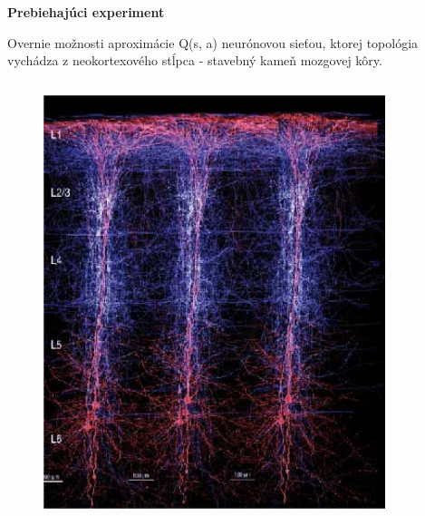 \documentclass[xcolor=dvipsnames]{beamer}
\begin{document}
\begin{frame}[fragile]{\bf Prebiehajúci experiment}

    Overnie možnosti aproximácie Q(s, a) neurónovou sieťou, ktorej topológia
    vychádza z neokortexového stĺpca - stavebný kameň mozgovej kôry.

    \begin{columns}
    	\begin{column}{0.4\textwidth}

            \begin{figure}[ht]

            \begin{center}
            \includegraphics[width=1.0\textwidth]{images/neocortex_column.jpg}
            \end{center}

            \end{figure}

    	\end{column}
    	\begin{column}{0.7\textwidth}


\end{column}
\end{columns}
\end{frame}
\end{document}
